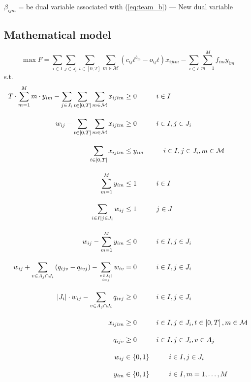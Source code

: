 \documentclass[12pt]{scrartcl}
\begin{document}
$\beta_{ijm}$ = be dual variable associated with (\ref{eq:team_b}) --- New dual variable
\vspace{-2mm}
\subsection{Mathematical model}
\vspace{-2mm}
\begin{equation}
     \max F = \sum_{i \in I} \sum_{j \in J_i} \sum_{t \in [0,T]} \sum_{m \in \mathcal{M}}  (c_{ij}t^{b_m} - o_{ij}t)  x_{ijtm} - \sum_{i \in I} \sum_{m=1}^{M} f_{im} y_{im}
     \label{eq:of_b}
\end{equation}
s.t.
\vspace{-2mm}
\begin{align}
     T \cdot \sum_{m=1}^{M}m \cdot y_{im} - \sum_{ j \in J_i} \sum_{t \in [0,T]} \sum_{m \in \mathcal{M}}   x_{ijtm}  &\ge 0   \hspace*{1cm} i \in I \label{eq:timealloc_b} \\[1em] 
     w_{ij} - \sum_{t \in [0,T]} \sum_{m \in \mathcal{M}}  x_{ijtm} &\ge 0  \hspace*{1cm} i \in I, j \in J_i \label{eq:scu_assign_b} \\[1em]
      \sum_{t \in [0,T]}  x_{ijtm}  & \le y_{im} \hspace*{1cm} i \in I, j \in J_i, m \in \mathcal{M} \label{eq:team_b} \\[1em]
     \sum_{m=1}^{M} y_{im} &\le 1 \hspace*{1cm} i \in I \label{eq:teamsize_b} \\[1em]
     \sum_{i \in I\mid j \in J_i} w_{ij}  & \le 1 \hspace*{1cm} j \in J \label{eq:distinctassign_b} \\[1em]
     w_{ij} - \sum_{m=1}^{M} y_{im} &\le 0     \hspace*{1cm} i \in I,  j \in J_i \label{eq:cuts_b} \\[1em]
     w_{ij} + \sum_{v \in A_j \cap J_i} \left(q_{ijv} - q_{ivj} \right) - \sum_{v \in J_i \mid \atop i=j} w_{iv} &= 0  \hspace*{1cm} i \in I,  j \in J_i \label{eq:flow1_b} \\[1em]
     \left|J_i\right|\cdot w_{ij} - \sum_{v \in A_j \cap J_i} q_{ivj} &\geq 0  \hspace*{1cm} i \in I, j \in J_i \label{eq:flow2_b} \\[1em]
     x_{ijtm} &\geq 0 \hspace*{1cm} i \in I, j \in J_i, t \in \left[0,T \right], m \in \mathcal{M} \label{eq:xvar_b} \\[1em]
     q_{ijv} &\geq 0 \hspace*{1cm} i \in I, j \in J_i, v \in A_j \label{eq:qvar_b} \\[1em]
     w_{ij} &\in \{0,1\} \hspace*{1cm} i \in I, j \in J_i \label{eq:wvar_b} \\[1em]
     y_{im} &\in \{0,1\} \hspace*{1cm} i \in I, m=1,\dots,M \label{eq:yvar_b}
\end{align}
\end{document}
